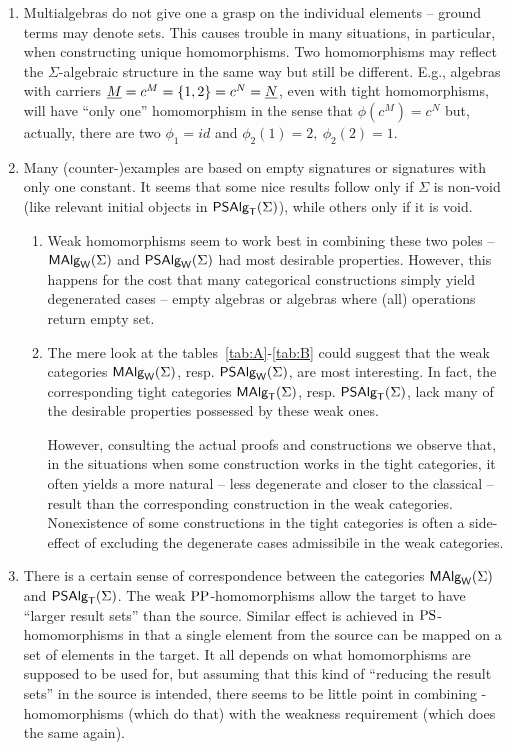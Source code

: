 \documentclass[10pt]{article}
\begin{document}
\begin{enumerate}
\item
Multialgebras do not give one a grasp on the individual elements --
ground terms may denote sets. This causes trouble in many situations,
in particular, when constructing unique homomorphisms. Two
homomorphisms may reflect the $\Sigma$-algebraic structure in the same
way but still be different.  E.g., algebras with carriers $\underline {M}=c^M=\{1,2\}=c^N=\underline {N}$, even with tight homomorphisms, will have
``only one'' homomorphism in the sense that $\phi(c^M)=c^N$ but,
actually, there are two $\phi_1 = id$ and $\phi_2(1)=2,\ \phi_2(2)=1$.

\item
Many (counter-)examples are based on empty signatures or signatures
with only one constant.  It seems that some nice results follow only
if $\Sigma$ is non-void (like relevant initial objects in $\mbox{\sf PSAlg}_{\sf T}(\Sigma)$),
while others only if it is void.
\begin{enumerate}
\item
Weak homomorphisms seem to work best in combining these two poles --
$\mbox{\rm\sf MAlg}_{\sf W}(\Sigma)$ and $\mbox{\sf PSAlg}_{\sf W}(\Sigma)$ had most desirable properties. However, this
happens for the cost that many categorical constructions simply yield
degenerated cases -- empty algebras or algebras where (all) operations
return empty set.
\item
The mere look at the tables~\ref{tab:A}-\ref{tab:B} could suggest that
the weak categories $\mbox{\rm\sf MAlg}_{\sf W}(\Sigma)$, resp. $\mbox{\sf PSAlg}_{\sf W}(\Sigma)$, are most interesting. In
fact, the corresponding tight categories $\mbox{\rm\sf MAlg}_{\sf T}(\Sigma)$, resp. $\mbox{\sf PSAlg}_{\sf T}(\Sigma)$, lack
many of the desirable properties possessed by these weak ones.

However, consulting the actual proofs and constructions we observe
that, in the situations when some construction works in the tight
categories, it often yields a more natural -- less degenerate and
closer to the classical -- result than the corresponding construction
in the weak categories. Nonexistence of some constructions in the
tight categories is often a side-effect of excluding the degenerate
cases admissibile in the weak categories.
\end{enumerate}

\item
There is a certain sense of correspondence between the categories
$\mbox{\rm\sf MAlg}_{\sf W}(\Sigma)$ and $\mbox{\sf PSAlg}_{\sf T}(\Sigma)$.  The weak ${\rm PP}$-homomorphisms allow the target
to have ``larger result sets'' than the source. Similar effect is
achieved in ${\rm PS}$-homomorphisms in that a single element from the
source can be mapped on a set of elements in the target. It all
depends on what homomorphisms are supposed to be used for, but
assuming that this kind of ``reducing the result sets'' in the source
is intended, there seems to be little point in combining
\PS-homomorphisms (which do that) with the weakness requirement (which
does the same again).


\end{enumerate}
\end{document}
